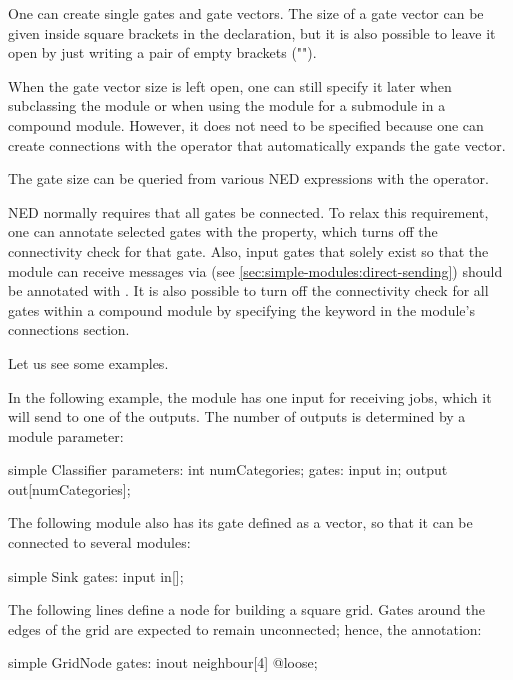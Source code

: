 One can create single gates and gate vectors. The size of a gate vector
can be given inside square brackets in the declaration, but it is also possible
to leave it open by just writing a pair of empty brackets ("\ttt{[]}").

When the gate vector size is left open, one can still specify it later
when subclassing the module or when using the module for a submodule in a
compound module. However, it does not need to be specified because
one can create connections with the  operator that
automatically expands the gate vector.

The gate size can be queried from various NED expressions with the
 operator.

NED normally requires that all gates be connected. To relax this
requirement, one can annotate selected gates with the 
property, which turns off the connectivity check for that gate. Also, input
gates that solely exist so that the module can receive messages via
 (see \ref{sec:simple-modules:direct-sending}) should
be annotated with . It is also possible to turn off the connectivity
check for all gates within a compound module by specifying the
 keyword in the module's connections section.

Let us see some examples.

In the following example, the  module has one input for
receiving jobs, which it will send to one of the outputs. The number of
outputs is determined by a module parameter:

\begin{ned}
simple Classifier {
    parameters:
        int numCategories;
    gates:
        input in;
        output out[numCategories];
}
\end{ned}

The following  module also has its  gate defined
as a vector, so that it can be connected to several modules:

\begin{ned}
simple Sink {
    gates:
        input in[];
}
\end{ned}

The following lines define a node for building a square grid. Gates around
the edges of the grid are expected to remain unconnected; hence, the
 annotation:

\begin{ned}
simple GridNode {
    gates:
        inout neighbour[4] @loose;
}
\end{ned}


